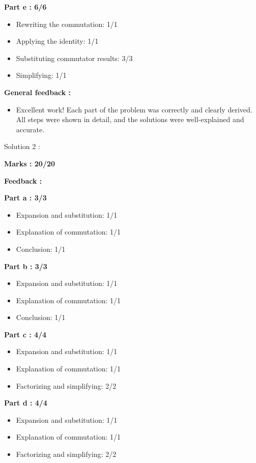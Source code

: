 \documentclass[a4paper,11pt]{article}
\begin{document}
\textbf{Part e : 6/6}

\begin{itemize}
    \item Rewriting the commutation: 1/1
    \item Applying the identity: 1/1
    \item Substituting commutator results: 3/3
    \item Simplifying: 1/1
\end{itemize}


\textbf{General feedback :}

\begin{itemize}
    \item Excellent work! Each part of the problem was correctly and clearly derived. All steps were shown in detail, and the solutions were well-explained and accurate.
\end{itemize}



Solution 2 :

\textbf{Marks : 20/20}

\textbf{Feedback :}

\textbf{Part a : 3/3}

\begin{itemize}
    \item Expansion and substitution: 1/1
    \item Explanation of commutation: 1/1
    \item Conclusion: 1/1
\end{itemize}


\textbf{Part b : 3/3}

\begin{itemize}
    \item Expansion and substitution: 1/1
    \item Explanation of commutation: 1/1
    \item Conclusion: 1/1
\end{itemize}


\textbf{Part c : 4/4}

\begin{itemize}
    \item Expansion and substitution: 1/1
    \item Explanation of commutation: 1/1
    \item Factorizing and simplifying: 2/2
\end{itemize}


\textbf{Part d : 4/4}

\begin{itemize}
    \item Expansion and substitution: 1/1
    \item Explanation of commutation: 1/1
    \item Factorizing and simplifying: 2/2
\end{itemize}
\end{document}
